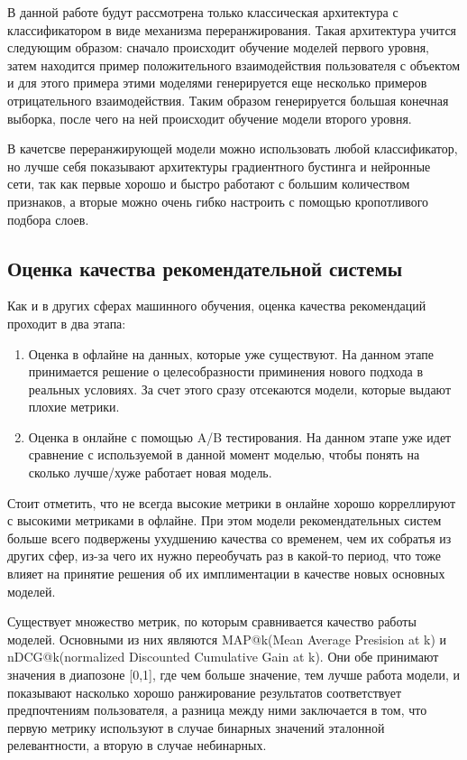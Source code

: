 \documentclass[bachelor, och, coursework]{SCWorks}
\begin{document}
В данной работе будут рассмотрена только классическая архитектура с классификатором в виде механизма
переранжирования. Такая архитектура учится следующим образом: сначало происходит обучение моделей первого уровня,
затем находится пример положительного взаимодействия пользователя
с объектом и для этого примера этими моделями генерируется еще несколько примеров отрицательного
взаимодействия. Таким образом генерируется большая конечная выборка, после чего на ней происходит обучение
модели второго уровня.

В качетсве переранжирующей модели можно использовать любой классификатор, но лучше себя показывают архитектуры
градиентного бустинга и нейронные сети, так как первые хорошо и быстро работают с большим количеством признаков,
а вторые можно очень гибко настроить с помощью кропотливого подбора слоев.

\subsection{Оценка качества рекомендательной системы}

Как и в других сферах машинного обучения, оценка качества рекомендаций проходит в два этапа:

\begin{enumerate}
    \item Оценка в офлайне на данных, которые уже существуют. На данном этапе принимается решение о
    целесобразности приминения нового подхода в реальных условиях. За счет этого сразу отсекаются
    модели, которые выдают плохие метрики.
    \item Оценка в онлайне с помощью A/B тестирования. На данном этапе уже идет сравнение с используемой
    в данной момент моделью, чтобы понять на сколько лучше/хуже работает новая модель.
\end{enumerate}

Стоит отметить, что не всегда высокие метрики в онлайне хорошо корреллируют с высокими метриками в офлайне.
При этом модели рекомендательных систем больше всего подвержены ухудшению качества со временем, чем их собратья
из других сфер, из-за чего их нужно переобучать раз в какой-то период, что тоже влияет на принятие решения
об их имплиментации в качестве новых основных моделей.

Существует множество метрик, по которым сравнивается качество работы моделей. Основными из них являются 
MAP@k(Mean Average Presision at k) и nDCG@k(normalized Discounted Cumulative Gain at k). Они обе принимают значения в диапозоне [0,1],
где чем больше значение, тем лучше работа модели, и показывают
насколько хорошо ранжирование результатов соответствует предпочтениям пользователя, а разница между ними заключается
в том, что первую метрику используют в случае бинарных значений эталонной релевантности, а вторую в случае
небинарных.
\end{document}
